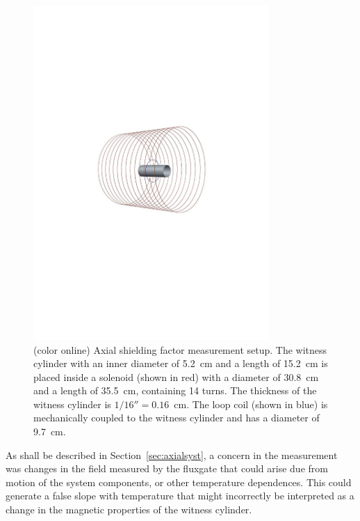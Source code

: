 \begin{figure}
  \begin{center}
    \includegraphics[width=0.8\textwidth]{geometry_pdf.pdf}
    \caption{(color online) Axial shielding factor measurement
      setup. The witness cylinder with an inner diameter of 5.2~cm and
      a length of 15.2~cm is placed inside a solenoid (shown in red)
      with a diameter of 30.8~cm and a length of 35.5~cm, containing
      14 turns.  The thickness of the witness cylinder is
      $1/16''=0.16$~cm.  The loop coil (shown in blue) is mechanically
      coupled to the witness cylinder and has a diameter of 9.7~cm.}
    \label{fig:geometry}
  \end{center}
\end{figure}

As shall be described in Section~\ref{sec:axialsyst}, a concern in the
measurement was changes in the field measured by the fluxgate that
could arise due from motion of the system components, or other
temperature dependences.  This could generate a false slope with
temperature that might incorrectly be interpreted as a change in the
magnetic properties of the witness cylinder.

